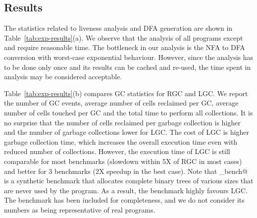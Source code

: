 \documentclass[9pt]{sigplanconf}
\begin{document}




\subsection{Results}

The statistics  related to  liveness analysis  and DFA  generation are
shown in Table~\ref{tab:exp-results}(a). We  observe that the analysis
of  all  programs  except \verb@treejoin@  and  \verb@sudoku@  require
reasonable time.   The bottleneck in  our analysis  is the NFA  to DFA
conversion with  worst-case exponential behaviour. However,  since the
analysis has  to be  done only  once and its  results can be cached and
re-used, the time spent in analysis may be considered acceptable.


Table~\ref{tab:exp-results}(b) compares  GC statistics
for RGC and  LGC.  We report the number of  GC events,
average  number of  cells  reclaimed per  GC,  average
number of cells  touched per GC and the  total time to
perform all collections.   It is no surprise that the  number of cells
reclaimed per garbage  collection is higher and the  number of garbage
collections  lower  for  LGC.   The  cost of  LGC  is  higher  garbage
collection time, which increases the  overall execution time even with
reduced number of  collections.  However, the execution time  of LGC is
still comparable for most benchmarks (slowdown within 5X of
RGC in most cases) and better  for 3 benchmarks (2X speedup in the
best case).  Note that  \verb@gc_bench@~\cite{gc_bench} is a synthetic
benchmark that allocates complete binary
trees  of various  sizes that  are  never used  by the  program. As  a
result,  the benchmark  highly favours  LGC.  The  benchmark has  been
included  for  completeness,  and  we  do  not  consider  its  numbers
as being representative of real programs.
\end{document}
